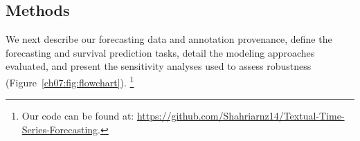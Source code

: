 \subsection{Methods}

We next describe our forecasting data and annotation provenance, define the forecasting and survival prediction tasks, detail the modeling approaches evaluated, and present the sensitivity analyses used to assess robustness (Figure~\ref{ch07:fig:flowchart}). \footnote{Our code can be found at: \url{https://github.com/Shahriarnz14/Textual-Time-Series-Forecasting}.
}





